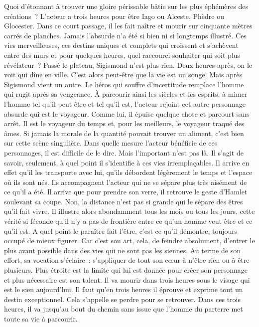 \documentclass{book}
\begin{document}
Quoi d'étonnant à trouver une gloire périssable bâtie sur les plus éphémères des créations ? L'acteur a trois heures pour être Iago ou Alceste, Phèdre ou Glocester. Dans ce court passage, il les fait naître et mourir sur cinquante mètres carrés de planches. Jamais l'absurde n'a été si bien ni si longtemps illustré. Ces vies merveilleuses, ces destins uniques et complets qui croissent et s'achèvent entre des murs et pour quelques heures, quel raccourci souhaiter qui soit plus révélateur ? Passé le plateau, Sigismond n'est plus rien. Deux heures après, on le voit qui dîne en ville. C'est alors peut‑être que la vie est un songe. Mais après Sigismond vient un autre. Le héros qui souffre d'incertitude remplace l'homme qui rugit après sa vengeance. À parcourir ainsi les siècles et les esprits, à mimer l'homme tel qu'il peut être et tel qu'il est, l'acteur rejoint cet autre personnage absurde qui est le voyageur. Comme lui, il épuise quelque chose et parcourt sans arrêt. Il est le voyageur du temps et, pour les meilleurs, le voyageur traqué des âmes. Si jamais la morale de la quantité pouvait trouver un aliment, c'est bien sur cette scène singulière. Dans quelle mesure l'acteur bénéficie de ces personnages, il est difficile de le dire. Mais l'important n'est pas là. Il s'agit de savoir, seulement, à quel point il s'identifie à ces vies irremplaçables. Il arrive en effet qu'il les transporte avec lui, qu'ils débordent légèrement le temps et l'espace où ils sont nés. Ils accompagnent l’acteur qui ne se sépare plus très aisément de ce qu'il a été. Il arrive que pour prendre son verre, il retrouve le geste d'Hamlet soulevant sa coupe. Non, la distance n'est pas si grande qui le sépare des êtres qu'il fait vivre. Il illustre alors abondamment tous les mois ou tous les jours, cette vérité si féconde qu'il n'y a pas de frontière entre ce qu'un homme veut être et ce qu'il est. A quel point le paraître fait l'être, c'est ce qu'il démontre, toujours occupé de mieux figurer. Car c'est son art, cela, de feindre absolument, d'entrer le plus avant possible dans des vies qui ne sont pas les siennes. Au terme de son effort, sa vocation s'éclaire : s'appliquer de tout son cœur à n'être rien ou à être plusieurs. Plus étroite est la limite qui lui est donnée pour créer son personnage et plus nécessaire est son talent. Il va mourir dans trois heures sous le visage qui est le sien aujourd'hui. Il faut qu'en trois heures il éprouve et exprime tout un destin exceptionnel. Cela s'appelle se perdre pour se retrouver. Dans ces trois heures, il va jusqu'au bout du chemin sans issue que l'homme du parterre met toute sa vie à parcourir.
\end{document}
